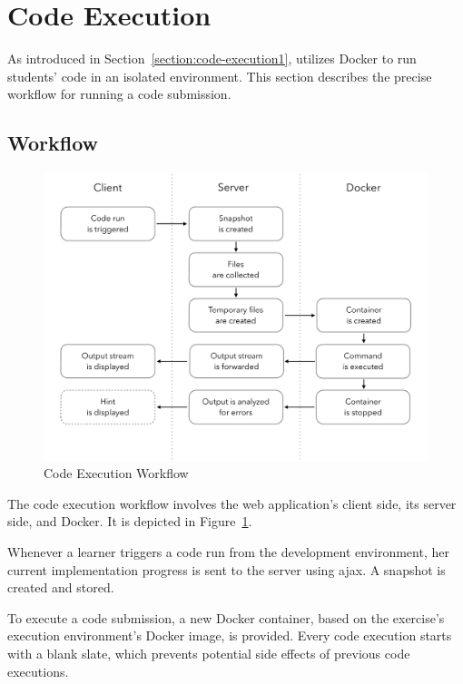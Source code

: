 \section{Code Execution}\label{section:code-execution2}

As introduced in Section~\ref{section:code-execution1}, \tool utilizes Docker to run students' code in an isolated environment. This section describes the precise workflow for running a code submission.

\subsection{Workflow}

\begin{figure}
\centering
\includegraphics[clip=true, trim=0.5cm 3cm 0.5cm 0.5cm, width=\textwidth]{images/code-execution}
\caption{Code Execution Workflow}
\label{figure:code-execution}
\end{figure}

The code execution workflow involves the web application's client side, its server side, and Docker. It is depicted in Figure~\ref{figure:code-execution}.

Whenever a learner triggers a code run from the development environment, her current implementation progress is sent to the server using \gls{ajax}. A snapshot is created and stored.

To execute a code submission, a new Docker container, based on the exercise's execution environment's Docker image, is provided. Every code execution starts with a blank slate, which prevents potential side effects of previous code executions.


